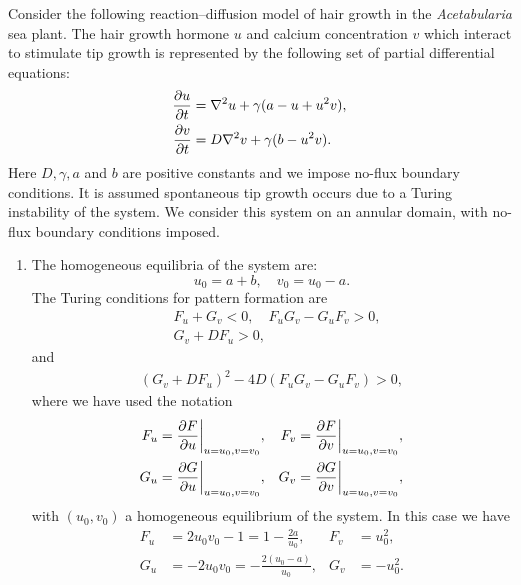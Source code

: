 \documentclass[a4paper, 12pt]{article}
\begin{document}
\begin{enumerate}[label={\bf \arabic{*}.\;}, ref={\arabic{*}},itemsep=3ex, left=0ex]
      {
        Consider the following reaction--diffusion model of hair growth in the \emph{Acetabularia} sea plant. The hair growth hormone $u$ and calcium concentration $v$ which interact to stimulate tip growth is represented by the following set of partial differential equations:
        \begin{subequations}
          \begin{align}
            \pd{u}{t} &= \nabla^2 u + \gamma(a - u + u^2v),\\
            \pd{v}{t} &= D\nabla^2 v + \gamma(b- u^2 v).
          \end{align}
        \end{subequations}
        Here $D,\gamma,a$ and $b$ are positive constants and we impose no-flux boundary conditions. It is assumed spontaneous tip growth occurs due to a Turing instability of the system. We consider this system on an annular domain, with no-flux boundary conditions imposed.
        \begin{enumerate}[label=(\alph*)]
          \item{The homogeneous equilibria of the system are:
              \begin{equation}
                u_0 =a+b,\quad v_0 = u_0-a.
              \end{equation}
              The Turing conditions for pattern formation are
              \begin{align}
                & F_u +G_v <0, \quad F_uG_v  -G_uF_v> 0,\nonumber \\
                & G_v + DF_u>0, \label{turingconditions4}
              \end{align}
              and
              \begin{align*}
                (G_v+ D F_u)^2 - 4 D (F_uG_v  -G_uF_v) >0,
              \end{align*}
              where we have used the notation
              \begin{align*}
                F_{u} &= \pd{F}{u}\bigg\vert_{u=u_0,v=v_0},& F_{v} &= \pd{F}{v}\bigg\vert_{u=u_0,v=v_0},\\
                G_{u} &= \pd{G}{u}\bigg\vert_{u=u_0,v=v_0},& G_{v} &= \pd{G}{v}\bigg\vert_{u=u_0,v=v_0},
              \end{align*}
              with $(u_0,v_0)$ a homogeneous equilibrium of the system. In this case we have
              \begin{align*}
                F_u &=2u_0v_0 -1 = 1- \frac{2a}{u_0},& F_v &= u_0^2,\\
                G_u&=-2u_0v_0 = -\frac{2(u_0-a)}{u_0},& G_v &= -u_0^2.
              \end{align*}

}
\end{enumerate}}
\end{enumerate}
\end{document}
